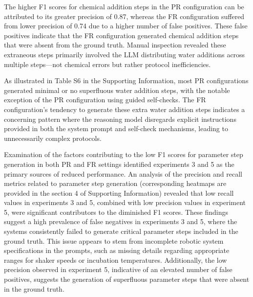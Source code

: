 \documentclass[sn-nature, twocolumn]{sn-jnl}%
\theoremstyle{thmstyleone}%
\theoremstyle{thmstyletwo}%
\theoremstyle{thmstylethree}%
\begin{document}
The higher F1 scores for chemical addition steps in the PR configuration can be attributed to its greater precision of 0.87, whereas the FR configuration suffered from lower precision of 0.74 due to a higher number of false positives. These false positives indicate that the FR configuration generated chemical addition steps that were absent from the ground truth. Manual inspection revealed these extraneous steps primarily involved the LLM distributing water additions across multiple steps—not chemical errors but rather protocol inefficiencies.

As illustrated in Table S6 in the Supporting Information, most PR configurations generated minimal or no superfluous water addition steps, with the notable exception of the PR configuration using guided self-checks. The FR configuration's tendency to generate these extra water addition steps indicates a concerning pattern where the reasoning model disregards explicit instructions provided in both the system prompt and self-check mechanisms, leading to unnecessarily complex protocols.




Examination of the factors contributing to the low F1 scores for parameter step generation in both PR and FR settings identified experiments 3 and 5 as the primary sources of reduced performance. An analysis of the precision and recall metrics related to parameter step generation (corresponding heatmaps are provided in the section 4 of Supporting Information) revealed that low recall values in experiments 3 and 5, combined with low precision values in experiment 5, were significant contributors to the diminished F1 scores.
These findings suggest a high prevalence of false negatives in experiments 3 and 5, where the systems consistently failed to generate critical parameter steps included in the ground truth. This issue appears to stem from incomplete robotic system specifications in the prompts, such as missing details regarding appropriate ranges for shaker speeds or incubation temperatures. Additionally, the low precision observed in experiment 5, indicative of an elevated number of false positives, suggests the generation of superfluous parameter steps that were absent in the ground truth.
\end{document}
